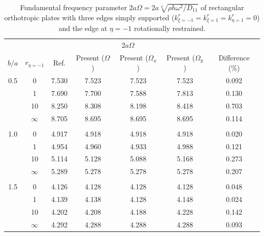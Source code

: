 \documentclass[preprint,12pt]{elsarticle}
\begin{document}
\begin{table}[!htbp]  
	\centering
	\caption{Fundamental frequency parameter \(2a\Omega = 2a\sqrt[4]{\rho h \omega^2/D_{11}}\) of rectangular orthotropic plates with three edges simply supported (\(k^r_{\xi=-1} = k^r_{\xi=1} = k^r_{\eta=1} = 0\)) and the edge at \(\eta = -1\) rotationally restrained.}
	\begin{tabular}{c c c c c c c }
		\toprule
		\multicolumn{2}{c}{} & \multicolumn{4}{c}{$2a\Omega$} & \\ 
		\cmidrule(lr){3-7}
		$b/a$ & $r_{\eta=-1}$ & Ref.\Citealp{zhang2019new} & Present ($\Omega$) & Present ($\Omega_x$) & Present ($\Omega_y$) & Difference (\%) \\ 
		\midrule
		0.5 & 0         & 7.530 & 7.523 & 7.523 & 7.523 & 0.092 \\ 
		& 1         & 7.690 & 7.700 & 7.588 & 7.813 & 0.130 \\ 
		& 10        & 8.250 & 8.308 & 8.198 & 8.418 & 0.703 \\ 
		& $\infty$  & 8.705 & 8.695 & 8.695 & 8.695 & 0.114 \\ 
		\\
		1.0 & 0         & 4.917 & 4.918 & 4.918 & 4.918 & 0.020 \\ 
		& 1         & 4.954 & 4.960 & 4.933 & 4.988 & 0.121 \\ 
		& 10        & 5.114 & 5.128 & 5.088 & 5.168 & 0.273 \\ 
		& $\infty$  & 5.289 & 5.278 & 5.278 & 5.278 & 0.207 \\ 
		\\
		1.5 & 0         & 4.126 & 4.128 & 4.128 & 4.128 & 0.048 \\ 
		& 1         & 4.139 & 4.138 & 4.128 & 4.148 & 0.024 \\ 
		& 10        & 4.202 & 4.208 & 4.188 & 4.228 & 0.142 \\ 
		& $\infty$  & 4.292 & 4.288 & 4.288 & 4.288 & 0.093 \\ 
		\bottomrule
	\end{tabular}
	\label{tab:oth2}
\end{table}
\end{document}

